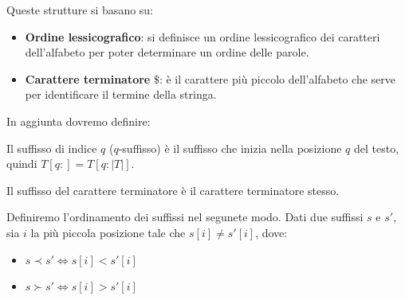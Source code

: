 Queste strutture si basano su:
\begin{itemize}
    \item \textbf{Ordine lessicografico}: si definisce un ordine lessicografico
          dei caratteri dell'alfabeto per poter determinare un ordine delle
          parole.
    \item \textbf{Carattere terminatore} $\$$: è il carattere più piccolo
          dell'alfabeto che serve per identificare il termine della stringa.
\end{itemize}
In aggiunta dovremo definire:
\begin{definizione}
    Il suffisso di indice $q$ ($q$-suffisso) è il suffisso che inizia nella
    posizione $q$ del testo, quindi $T[q:]= T[q:|T|]$.
\end{definizione}
Il suffisso del carattere terminatore è il carattere terminatore stesso.
\begin{definizione}
    Definiremo l'ordinamento dei suffissi nel segunete modo. Dati due suffissi
    $s$ e $s'$, sia $i$ la più piccola posizione tale che $s[i] \neq s'[i]$, dove:
    \begin{itemize}
        \item $s \prec s'\iff s[i] < s'[i]$
        \item $s \succ s'\iff s[i] > s'[i]$
    \end{itemize}
\end{definizione}
